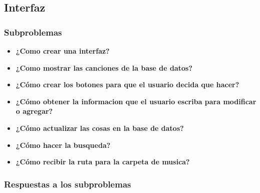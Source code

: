 \documentclass{article}
\begin{document}
\subsection{Interfaz}

\subsubsection{Subproblemas}

\begin{itemize}
    \item \textbf{¿Como crear una interfaz?}

    \item \textbf{¿Como mostrar las canciones de la base de datos?}
    
    \item \textbf{¿Cómo crear los botones para que el usuario decida que hacer?}
    
    \item \textbf{¿Cómo obtener la informacion que el usuario escriba para modificar o agregar?}
    
    \item \textbf{¿Cómo actualizar las cosas en la base de datos?}
    
    \item \textbf{¿Cómo hacer la busqueda?}

    \item \textbf{¿Cómo recibir la ruta para la carpeta de musica?}
\end{itemize}

\subsubsection{Respuestas a los subproblemas}
\end{document}
